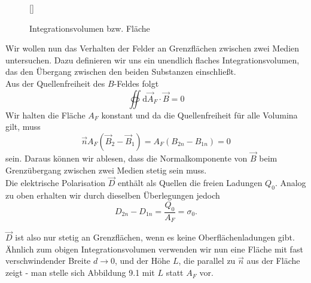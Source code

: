 \begin{wrapfigure}[]{r}[0cm]{0cm}
	\raisebox{0pt}[\dimexpr{}\baselineskip\relax]{
		\colorbox{hgrey}{
		}
	}
	\caption{Integrationsvolumen  bzw. Fläche}
\end{wrapfigure}
Wir wollen nun das Verhalten der Felder an Grenzflächen zwischen zwei Medien untersuchen. Dazu definieren wir uns ein unendlich flaches Integrationsvolumen, das den Übergang zwischen den beiden Substanzen einschließt.\\
Aus der Quellenfreiheit des $B$-Feldes folgt
\begin{equation*}
\oiint\mathrm{d}\vec{A}_F\cdot\vec{B}=0
\end{equation*}
Wir halten die Fläche $A_F$ konstant und da die Quellenfreiheit für alle Volumina gilt, muss 
\begin{equation*}
\vec{n}A_F(\vec{B}_2-\vec{B}_1) = A_F(B_{2n}-B_{1n}) = 0
\end{equation*}
sein. Daraus können wir ablesen, dass die Normalkomponente von $\vec{B}$ beim Grenzübergang zwischen zwei Medien stetig sein muss.\\

Die elektrische Polarisation $\vec{D}$ enthält als Quellen die freien Ladungen $Q_0$. Analog zu oben erhalten wir durch dieselben Überlegungen jedoch
\begin{equation*}
D_{2n}-D_{1n}=\frac{Q_0}{A_F}=\sigma_0.
\end{equation*}

$\vec{D}$ ist also nur stetig an Grenzflächen, wenn es keine Oberflächenladungen gibt.\\

Ähnlich zum obigen Integrationsvolumen verwenden wir nun eine Fläche mit fast verschwindender Breite $d\rightarrow 0$, und der Höhe $L$, die parallel zu $\vec{n}$ aus der Fläche zeigt - man stelle sich Abbildung 9.1 mit $L$ statt $A_F$ vor.\\


